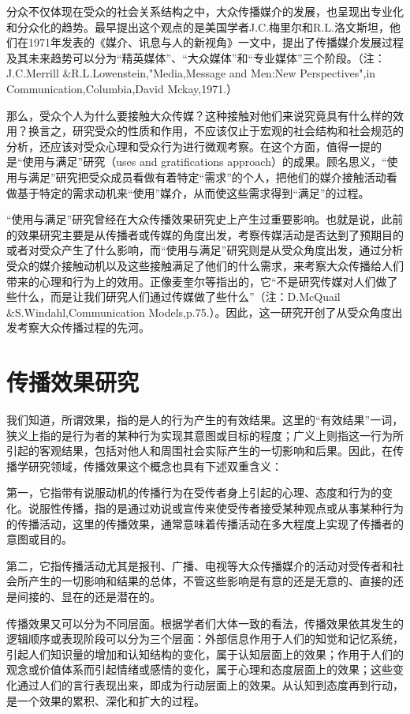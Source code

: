 \documentclass[UTF8,12pt]{ctexart}
\numberwithin{equation}{section} %
\numberwithin{figure}{section}
\numberwithin{table}{section}
\begin{document}
	分众不仅体现在受众的社会关系结构之中，大众传播媒介的发展，也呈现出专业化和分众化的趋势。最早提出这个观点的是美国学者J.C.梅里尔和R.L.洛文斯坦，他们在1971年发表的《媒介、讯息与人的新视角》一文中，提出了传播媒介发展过程及其未来趋势可以分为“精英媒体”、“大众媒体”和“专业媒体”三个阶段。（注：J.C.Merrill \&R.L.Lowenstein,"Media,Message and Men:New Perspectives",in Communication,Columbia,David Mckay,1971.）
	
	
	
	那么，受众个人为什么要接触大众传媒？这种接触对他们来说究竟具有什么样的效用？换言之，研究受众的性质和作用，不应该仅止于宏观的社会结构和社会规范的分析，还应该对受众心理和受众行为进行微观考察。在这个方面，值得一提的是“使用与满足”研究（uses and gratifications approach）的成果。顾名思义，“使用与满足”研究把受众成员看做有着特定“需求”的个人，把他们的媒介接触活动看做基于特定的需求动机来“使用”媒介，从而使这些需求得到“满足”的过程。
	
	“使用与满足”研究曾经在大众传播效果研究史上产生过重要影响。也就是说，此前的效果研究主要是从传播者或传媒的角度出发，考察传媒活动是否达到了预期目的或者对受众产生了什么影响，而“使用与满足”研究则是从受众角度出发，通过分析受众的媒介接触动机以及这些接触满足了他们的什么需求，来考察大众传播给人们带来的心理和行为上的效用。正像麦奎尔等指出的，它“不是研究传媒对人们做了些什么，而是让我们研究人们通过传媒做了些什么”（注：D.McQuail \&S.Windahl,Communication Models,p.75.）。因此，这一研究开创了从受众角度出发考察大众传播过程的先河。
	
	\section{传播效果研究}
	我们知道，所谓效果，指的是人的行为产生的有效结果。这里的“有效结果”一词，狭义上指的是行为者的某种行为实现其意图或目标的程度；广义上则指这一行为所引起的客观结果，包括对他人和周围社会实际产生的一切影响和后果。因此，在传播学研究领域，传播效果这个概念也具有下述双重含义：
	
	第一，它指带有说服动机的传播行为在受传者身上引起的心理、态度和行为的变化。说服性传播，指的是通过劝说或宣传来使受传者接受某种观点或从事某种行为的传播活动，这里的传播效果，通常意味着传播活动在多大程度上实现了传播者的意图或目的。
	
	第二，它指传播活动尤其是报刊、广播、电视等大众传播媒介的活动对受传者和社会所产生的一切影响和结果的总体，不管这些影响是有意的还是无意的、直接的还是间接的、显在的还是潜在的。
	
	传播效果又可以分为不同层面。根据学者们大体一致的看法，传播效果依其发生的逻辑顺序或表现阶段可以分为三个层面：外部信息作用于人们的知觉和记忆系统，引起人们知识量的增加和认知结构的变化，属于认知层面上的效果；作用于人们的观念或价值体系而引起情绪或感情的变化，属于心理和态度层面上的效果；这些变化通过人们的言行表现出来，即成为行动层面上的效果。从认知到态度再到行动，是一个效果的累积、深化和扩大的过程。
	
\end{document}
